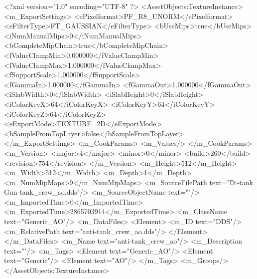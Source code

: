 <?xml version="1.0" encoding="UTF-8" ?>
<AssetObjects:TextureInstance>
	<m_ExportSettings>
		<ePixelformat>PF_R8_UNORM</ePixelformat>
		<eFilterType>FT_GAUSSIAN</eFilterType>
		<bUseMips>true</bUseMips>
		<iNumManualMips>0</iNumManualMips>
		<bCompleteMipChain>true</bCompleteMipChain>
		<fValueClampMin>0.000000</fValueClampMin>
		<fValueClampMax>1.000000</fValueClampMax>
		<fSupportScale>1.000000</fSupportScale>
		<fGammaIn>1.000000</fGammaIn>
		<fGammaOut>1.000000</fGammaOut>
		<iSlabWidth>0</iSlabWidth>
		<iSlabHeight>0</iSlabHeight>
		<iColorKeyX>64</iColorKeyX>
		<iColorKeyY>64</iColorKeyY>
		<iColorKeyZ>64</iColorKeyZ>
		<eExportMode>TEXTURE_2D</eExportMode>
		<bSampleFromTopLayer>false</bSampleFromTopLayer>
	</m_ExportSettings>
	<m_CookParams>
		<m_Values/>
	</m_CookParams>
	<m_Version>
		<major>4</major>
		<minor>0</minor>
		<build>260</build>
		<revision>754</revision>
	</m_Version>
	<m_Height>512</m_Height>
	<m_Width>512</m_Width>
	<m_Depth>1</m_Depth>
	<m_NumMipMaps>9</m_NumMipMaps>
	<m_SourceFilePath text="D:\Units\Anti-tank Gun\anti-tank_crew_ao.dds"/>
	<m_SourceObjectName text=""/>
	<m_ImportedTime>0</m_ImportedTime>
	<m_ExportedTime>2865703914</m_ExportedTime>
	<m_ClassName text="Generic_AO"/>
	<m_DataFiles>
		<Element>
			<m_ID text="DDS"/>
			<m_RelativePath text="anti-tank_crew_ao.dds"/>
		</Element>
	</m_DataFiles>
	<m_Name text="anti-tank_crew_ao"/>
	<m_Description text=""/>
	<m_Tags>
		<Element text="Generic_AO"/>
		<Element text="Generic"/>
		<Element text="AO"/>
	</m_Tags>
	<m_Groups/>
</AssetObjects:TextureInstance>

 